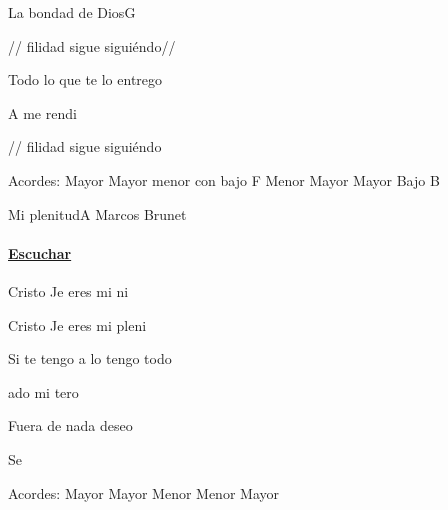 \documentclass[12pt, spanish]{book}
\begin{document}
\begin{song}{La bondad de Dios}{G}
        \begin{SBOpGroup}
            // filidad sigue siguiéndo//

            Todo lo que  te lo entrego 

            A  me rendi

            // filidad sigue siguiéndo
        \end{SBOpGroup}

        \ifChordBk
        \begin{SBOpGroup}
            Acordes:
             Mayor \hfill
             Mayor \hfill\null\break
             menor con bajo F \hfill
             Menor \hfill\null\break
             Mayor \hfill
             Mayor Bajo B \hfill\null\break
        \end{SBOpGroup}

        \fi
    \end{song}

    \begin{song}{Mi plenitud}{A}
        {} %
        {Marcos Brunet}
        {} %
        {}
        \ifChordBk
        \paragraph{\mbox{}\hfill\protect\href{https://open.spotify.com/intl-es/track/1wGFaE9jsAhJb7b8WfNBkT}{Escuchar}\mbox{}\hfill}
        \fi


        \begin{SBOpGroup}
            Cristo Je eres mi ni~

            Cristo Je eres mi pleni
        \end{SBOpGroup}

        \begin{SBChorus}
            Si te tengo a  lo tengo todo

             ado mi tero

            Fuera de  nada deseo

            Se
        \end{SBChorus}

        \ifChordBk
        \begin{SBOpGroup}
            Acordes:
             Mayor \hfill
             Mayor \hfill\null\break
             Menor \hfill
             Menor \hfill\null\break
             Mayor \hfill
        \end{SBOpGroup}
        \fi
    \end{song}
\end{document}
